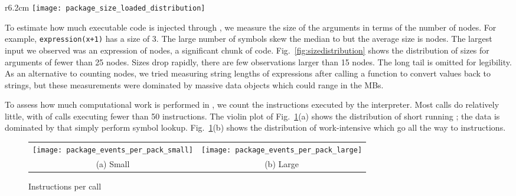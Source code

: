 \documentclass[acmsmall, screen]{acmart}
\renewcommand{\k}[1]{\lstinline |#1|\xspace}
\begin{document}
\begin{wrapfigure}{r}{6.2cm}
\hspace{-3.3cm} \texttt{[image: package\_size\_loaded\_distribution]}
\caption{Loaded code} \label{fig:sizedistribution}
\end{wrapfigure}

To estimate how much executable code is injected through \eval, we measure the
size of the arguments in terms of the number of nodes. For example,
\k{expression(x+1)} has a size of 3. The large number of symbols skew the median
to \packageMedianszeval but the average size is \packageAvgszeval nodes. The
largest \eval input we observed was an expression of \packageMaxszeval nodes, a
significant chunk of code. Fig.~\ref{fig:sizedistribution} shows the
distribution of sizes for arguments of fewer than 25 nodes. Sizes drop rapidly,
there are few observations larger than 15 nodes. The long tail is omitted for
legibility. As an alternative to counting nodes, we tried measuring string
lengths of expressions after calling a function to convert values back to
strings, but these measurements were dominated by massive data objects which
could range in the MBs.

To assess how much computational work is performed in \evals, we count the
instructions executed by the interpreter. Most calls do relatively little, with
\packageSmalleventspct of calls executing fewer than 50 instructions. The violin
plot of Fig.~\ref{ev}(a) shows the distribution of short running \evals; the
data is dominated by \evals that simply perform symbol lookup. Fig.~\ref{ev}(b)
shows the distribution of work-intensive \evals which go all the way to
\packageMaxeventsRnd instructions.

\begin{figure}[h!]
\begin{tabular}{@{}c@{}c@{}}
\begin{minipage}{7.5cm}
 \texttt{[image: package\_events\_per\_pack\_small]}
\end{minipage}&\begin{minipage}{7.5cm}
  \texttt{[image: package\_events\_per\_pack\_large]}
\end{minipage}\\[-3mm]
\small (a) Small & \small (b) Large
\end{tabular}
 \caption{Instructions per call} \label{ev}
\end{figure}
\end{document}
